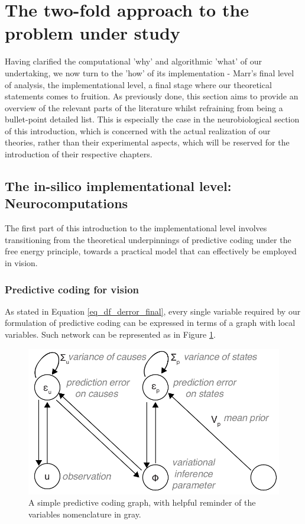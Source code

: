 \newpage 



\section{The two-fold approach to the problem under study}
Having clarified the computational 'why' and algorithmic 'what' of our undertaking, we now turn to the 'how' of its implementation - Marr's final level of analysis, the implementational level, a final stage where our theoretical statements comes to fruition. As previously done, this section aims to provide an overview of the relevant parts of the literature whilst refraining from being a bullet-point detailed list. This is especially the case in the neurobiological section of this introduction, which is concerned with the actual realization of our theories, rather than their experimental aspects, which will be reserved for the introduction of their respective chapters.



\subsection{The in-silico implementational level: Neurocomputations}
The first part of this introduction to the implementational level involves transitioning from the theoretical underpinnings of predictive coding under the free energy principle, towards a practical model that can effectively be employed in vision.



\subsubsection{Predictive coding for vision}
As stated in Equation \ref{eq_df_derror_final}, every single variable required by our formulation of predictive coding can be expressed in terms of a graph with local variables. Such network can be represented as in Figure \ref{fig_chap2_pc_graphs}.

\begin{figure}[h!tbp]
\vspace{0.5cm}
\centering
\includegraphics[width=.85\textwidth]{fig/chap2_fig_pc_graph.pdf}
\caption[A simple predictive coding graph.]{A simple predictive coding graph, with helpful reminder of the variables nomenclature in gray.}
\label{fig_chap2_pc_graphs}
\end{figure}

